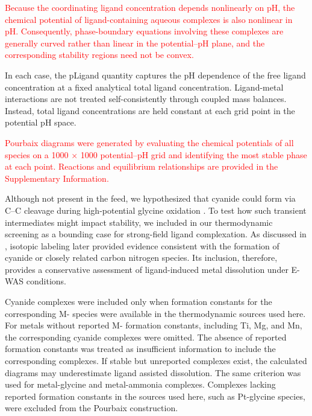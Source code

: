 \documentclass[twoside,twocolumn,9pt]{article}
\begin{document}
\textcolor{red}{Because the coordinating ligand concentration depends nonlinearly on pH, the chemical potential of ligand-containing aqueous complexes is also nonlinear in pH. Consequently, phase-boundary equations involving these complexes are generally curved rather than linear in the potential–pH plane, and the corresponding stability regions need not be convex.}

In each case, the pLigand quantity captures the pH dependence of the free ligand concentration at a fixed analytical total ligand concentration. Ligand-metal interactions are not treated self-consistently through coupled mass balances. Instead, total ligand concentrations are held constant at each grid point in the potential pH space.

\textcolor{red}{Pourbaix diagrams were generated by evaluating the chemical potentials of all species on a 1000 $\times$ 1000 potential–pH grid and identifying the most stable phase at each point. Reactions and equilibrium relationships are provided in the Supplementary Information.
}

Although not present in the feed, we hypothesized that cyanide could form via C–C cleavage during high-potential glycine oxidation \cite{Oraby2020GoldPermanganate, Chen2013AdsorptionStudy}. To test how such transient intermediates might impact stability, we included  in our thermodynamic screening as a bounding case for strong-field ligand complexation. As discussed in , isotopic labeling later provided evidence consistent with the formation of cyanide or closely related carbon nitrogen species. Its inclusion, therefore, provides a conservative assessment of ligand-induced metal dissolution under E-WAS conditions.

Cyanide complexes were included only when formation constants for the corresponding M- species were available in the thermodynamic sources used here. For metals without reported M- formation constants, including Ti, Mg, and Mn, the corresponding cyanide complexes were omitted. The absence of reported formation constants was treated as insufficient information to include the corresponding complexes. If stable but unreported complexes exist, the calculated diagrams may underestimate ligand assisted dissolution. The same criterion was used for metal-glycine and metal-ammonia complexes. Complexes lacking reported formation constants in the sources used here, such as Pt-glycine species, were excluded from the Pourbaix construction.
\end{document}
